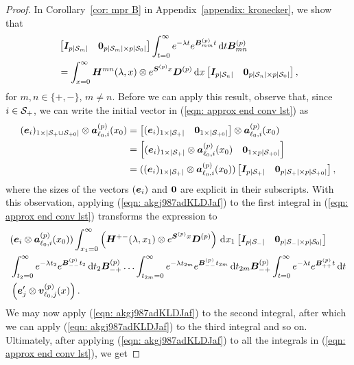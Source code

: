 \begin{proof}
In Corollary~\ref{cor: mpr B} in Appendix~\ref{appendix: kronecker}, we show that
\begin{align}
	&\begin{bmatrix} \boldsymbol I_{p|\mathcal{S}_m|} & \boldsymbol 0_{p|\mathcal{S}_m|\times p|\mathcal{S}_0|}  \end{bmatrix}\int_{t=0}^\infty e^{-\lambda t} e^{\boldsymbol{B}^{(p)}_{mm}t} \, \mathrm{d} t \boldsymbol{B}^{(p)}_{m{n}} \nonumber 
	\\&= \int_{x=0}^\infty \boldsymbol H^{mn}(\lambda,x)  \otimes  e^{\boldsymbol S^{(p)} x}\boldsymbol D^{(p)}\, \mathrm{d} x \begin{bmatrix} \boldsymbol I_{p|\mathcal{S}_n|} & \boldsymbol 0_{p|\mathcal{S}_n|\times p|\mathcal{S}_0|} \end{bmatrix}, \label{eqn: akgj987adKLDJaf}
\end{align}
for \(m,n\in\{+,-\}\), \(m\neq n\). Before we can apply this result, observe that, since \(i\in\mathcal{S}_+\), we can write the initial vector in (\ref{eqn: approx end conv lst}) as 
\begin{align}
	(\boldsymbol e_i)_{1\times |\mathcal{S}_+\cup\mathcal{S}_{+0}|}\otimes \boldsymbol  a_{\ell_0,i}^{(p)}(x_0) &= 
	\begin{bmatrix} (\boldsymbol e_i)_{1\times |\mathcal{S}_+|} & \boldsymbol 0_{1\times |\mathcal{S}_{+0}|} \end{bmatrix} \otimes \boldsymbol  a_{\ell_0,i}^{(p)}(x_0) \nonumber 
	\\&= \begin{bmatrix} (\boldsymbol e_i)_{1\times |\mathcal{S}_+|}\otimes \boldsymbol  a_{\ell_0,i}^{(p)}(x_0)  & \boldsymbol 0_{1\times p|\mathcal{S}_{+0}|} \end{bmatrix} \nonumber 
	\\&= ((\boldsymbol e_i)_{1\times |\mathcal{S}_+|}\otimes \boldsymbol  a_{\ell_0,i}^{(p)}(x_0))\begin{bmatrix} \boldsymbol I_{p|\mathcal{S}_+|} & \boldsymbol 0_{p|\mathcal{S}_+|\times p|\mathcal{S}_{+0}|} \end{bmatrix},
\end{align}
where the sizes of the vectors \((\boldsymbol e_i)\) and \(\boldsymbol 0\) are explicit in their subscripts. 
With this observation, applying (\ref{eqn: akgj987adKLDJaf}) to the first integral in (\ref{eqn: approx end conv lst}) transforms the expression to 
\begin{align}
	&(\boldsymbol e_i\otimes \boldsymbol  a_{\ell_0,i}^{(p)}(x_0)) \int_{x_1=0}^\infty \left(\boldsymbol H^{+{-}}(\lambda,x_1) \otimes e^{\boldsymbol S^{(p)} x}\boldsymbol D^{(p)}\right) \, \mathrm{d} x_1 \begin{bmatrix} \boldsymbol I_{p|\mathcal{S}_-|} & \boldsymbol 0_{p|\mathcal{S}_-|\times p|\mathcal{S}_0|} \end{bmatrix} \nonumber
	\\&\int_{t_2=0}^\infty e^{-\lambda t_2} e^{\boldsymbol{B}^{(p)}_{--}t_2} \, \mathrm{d} t_2\boldsymbol{B}^{(p)}_{-{+}} 
	\hdots 
	\int_{t_{2m}=0}^\infty e^{-\lambda t_{2m}}e^{\boldsymbol{B}^{(p)}_{--}t_{2m}} \, \mathrm{d} t_{2m}\boldsymbol{B}^{(p)}_{-{+}} 
	\int_{t=0}^\infty e^{-\lambda t}e^{\boldsymbol{B}^{(p)}_{++}t} \, \mathrm{d} t \nonumber
	\\&\left(\boldsymbol e_j'{} \otimes {\boldsymbol v}_{\ell_0,j}^{(p)}( x)\right). \label{eqn: approx end conv lst2}
\end{align}
We may now apply (\ref{eqn: akgj987adKLDJaf}) to the second integral, after which we can apply (\ref{eqn: akgj987adKLDJaf}) to the third integral and so on. Ultimately, after applying (\ref{eqn: akgj987adKLDJaf}) to all the integrals in (\ref{eqn: approx end conv lst}), we get 

\end{proof}
